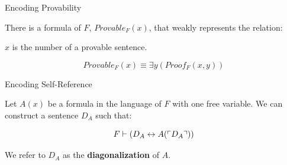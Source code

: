 \documentclass{beamer}
\begin{document}
\begin{frame}{Encoding Provability}

  \begin{corollary}

    There is a formula of $F$, $Provable_F(x)$, that weakly represents the
    relation:

    $x$ is the \godel{} number of a provable sentence.

  \end{corollary}

  \pause

  $$Provable_F(x) \equiv \exists y (Proof_F(x, y)) $$

\end{frame}

\begin{frame}{Encoding Self-Reference}
  \begin{Theorem}

    Let $A(x)$ be a formula in the language of $F$ with one free variable. We
    can construct a sentence $D_A$ such that:

    $$F \vdash (D_A \leftrightarrow A(\ulcorner D_A \urcorner))$$

  \end{Theorem}

  We refer to $D_A$ as the \textbf{diagonalization} of $A$.

\end{frame}
\end{document}

